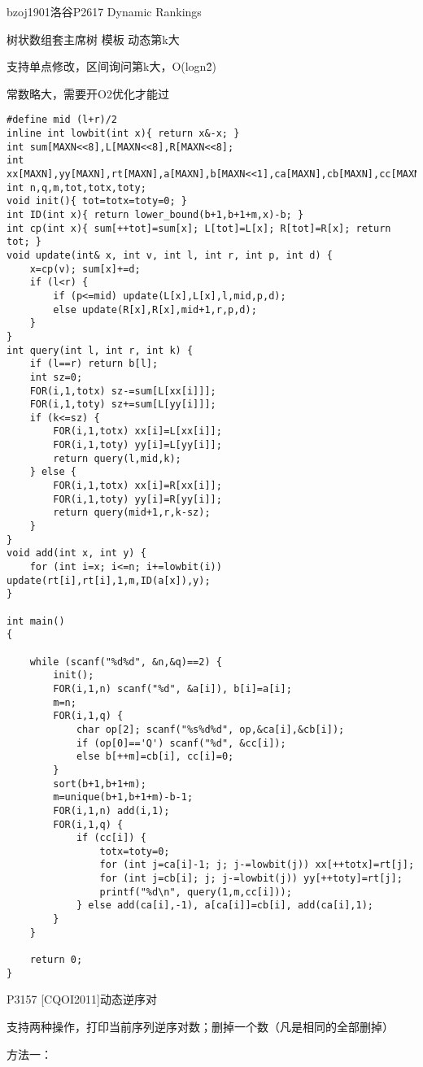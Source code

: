 bzoj1901洛谷P2617 Dynamic Rankings

树状数组套主席树 模板 动态第k大

支持单点修改，区间询问第k大，O(logn\^2)

常数略大，需要开O2优化才能过

\begin{lstlisting}
#define mid (l+r)/2
inline int lowbit(int x){ return x&-x; }
int sum[MAXN<<8],L[MAXN<<8],R[MAXN<<8];
int xx[MAXN],yy[MAXN],rt[MAXN],a[MAXN],b[MAXN<<1],ca[MAXN],cb[MAXN],cc[MAXN];
int n,q,m,tot,totx,toty;
void init(){ tot=totx=toty=0; }
int ID(int x){ return lower_bound(b+1,b+1+m,x)-b; }
int cp(int x){ sum[++tot]=sum[x]; L[tot]=L[x]; R[tot]=R[x]; return tot; }
void update(int& x, int v, int l, int r, int p, int d) {
    x=cp(v); sum[x]+=d;
    if (l<r) {
        if (p<=mid) update(L[x],L[x],l,mid,p,d);
        else update(R[x],R[x],mid+1,r,p,d);
    }
}
int query(int l, int r, int k) {
    if (l==r) return b[l];
    int sz=0;
    FOR(i,1,totx) sz-=sum[L[xx[i]]];
    FOR(i,1,toty) sz+=sum[L[yy[i]]];
    if (k<=sz) {
        FOR(i,1,totx) xx[i]=L[xx[i]];
        FOR(i,1,toty) yy[i]=L[yy[i]];
        return query(l,mid,k);
    } else {
        FOR(i,1,totx) xx[i]=R[xx[i]];
        FOR(i,1,toty) yy[i]=R[yy[i]];
        return query(mid+1,r,k-sz);
    }
}
void add(int x, int y) {
    for (int i=x; i<=n; i+=lowbit(i)) update(rt[i],rt[i],1,m,ID(a[x]),y);
}

int main()
{

    while (scanf("%d%d", &n,&q)==2) {
        init();
        FOR(i,1,n) scanf("%d", &a[i]), b[i]=a[i];
        m=n;
        FOR(i,1,q) {
            char op[2]; scanf("%s%d%d", op,&ca[i],&cb[i]);
            if (op[0]=='Q') scanf("%d", &cc[i]);
            else b[++m]=cb[i], cc[i]=0;
        }
        sort(b+1,b+1+m);
        m=unique(b+1,b+1+m)-b-1;
        FOR(i,1,n) add(i,1);
        FOR(i,1,q) {
            if (cc[i]) {
                totx=toty=0;
                for (int j=ca[i]-1; j; j-=lowbit(j)) xx[++totx]=rt[j];
                for (int j=cb[i]; j; j-=lowbit(j)) yy[++toty]=rt[j];
                printf("%d\n", query(1,m,cc[i]));
            } else add(ca[i],-1), a[ca[i]]=cb[i], add(ca[i],1);
        }
    }

    return 0;
}
\end{lstlisting}

P3157 [CQOI2011]动态逆序对

支持两种操作，打印当前序列逆序对数；删掉一个数（凡是相同的全部删掉）

方法一：

